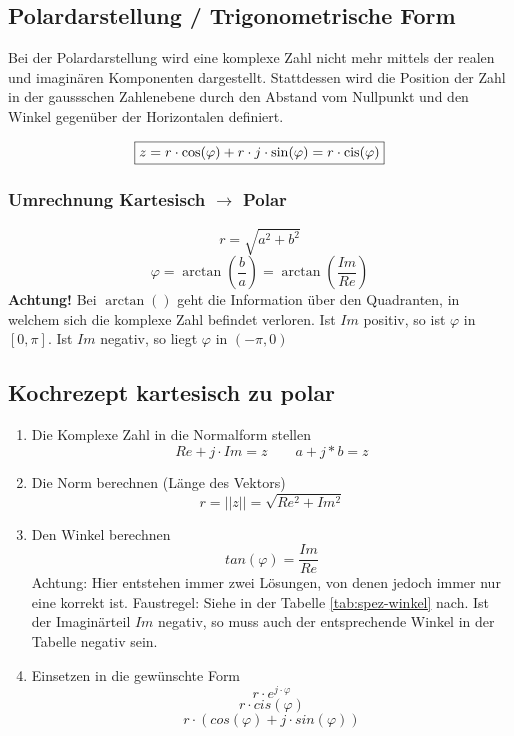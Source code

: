 \subsection{Polardarstellung / Trigonometrische Form}
Bei der Polardarstellung wird eine komplexe Zahl nicht mehr mittels der realen 
und imaginären Komponenten dargestellt. Stattdessen wird die Position der Zahl 
in der gaussschen Zahlenebene durch den Abstand vom Nullpunkt und den Winkel 
gegenüber der Horizontalen definiert. 
\begin{center}
\end{center}
\[ \boxed{z = r \cdot \cos(\varphi) + r \cdot j \cdot \sin(\varphi) 
= r \cdot \operatorname{cis}(\varphi)} \]

\subsubsection{Umrechnung Kartesisch $\rightarrow$ Polar}
\[ \boxed{r = \sqrt{a^2 + b^2}} \]
\[ \boxed{\varphi = \arctan{\left(\frac{b}{a}\right)} = 
          \arctan{\left(\frac{Im}{Re}\right)}} \]
\textbf{Achtung!} Bei $\arctan()$ geht die Information über den Quadranten, in 
welchem sich die komplexe Zahl befindet verloren. Ist $Im$ positiv, so ist 
$\varphi$ in $[0,\pi]$. Ist $Im$ negativ, so liegt $\varphi$ in $(-\pi,0)$
\subsection{Kochrezept kartesisch zu polar}
\begin{enumerate}
	\item Die Komplexe Zahl in die Normalform stellen 
		\[ Re + j\cdot Im = z \qquad a + j*b = z \]
	\item Die Norm berechnen (Länge des Vektors)
		\[ r=||z||=\sqrt{Re^2+Im^2} \]
	\item Den Winkel berechnen
		\[ tan(\varphi)=\frac{Im}{Re} \]
		Achtung: Hier entstehen immer zwei Lösungen, von denen jedoch
		immer nur eine korrekt ist.
		Faustregel: Siehe in der Tabelle \ref{tab:spez-winkel} nach. 
		Ist der Imaginärteil $Im$ negativ, so muss auch der entsprechende
		Winkel in der Tabelle negativ sein.
	\item Einsetzen in die gewünschte Form
		\[ r \cdot e^{j\cdot\varphi} \]
		\[ r \cdot cis(\varphi) \]
		\[ r \cdot (cos(\varphi) + j \cdot sin(\varphi)) \]
\end{enumerate}

